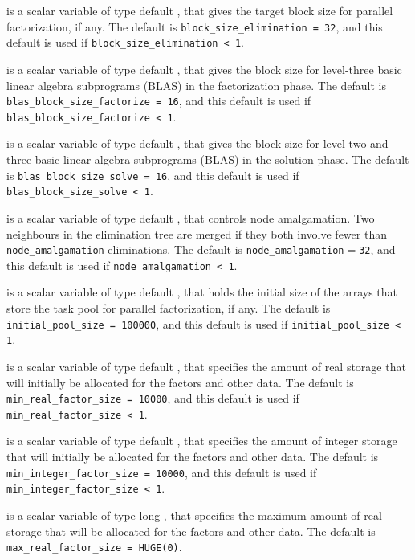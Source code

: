 \documentclass{galahad}
\begin{document}
\begin{description}
 is a scalar variable of type default \integer,
that gives the target block size for parallel factorization, if any.
The default is {\tt block\_size\_elimination = 32},
and this default is used if {\tt block\_size\_\-elimination < 1}.

 is a scalar variable of type default \integer,
that gives the block size for level-three basic linear algebra subprograms
(BLAS) in the factorization phase.
The default is {\tt blas\_block\_size\_factorize = 16},
and this default is used if {\tt blas\_block\_size\_factorize < 1}.

 is a scalar variable of type default \integer,
that gives the block size for level-two and -three basic linear algebra
subprograms (BLAS) in the solution phase.
The default is {\tt blas\_block\_size\_solve = 16},
and this default is used if {\tt blas\_block\_size\_solve < 1}.

 is a scalar variable of type default \integer,
that controls node amalgamation. Two neighbours in the elimination tree are
merged if they both involve fewer than {\tt node\_amalgamation} eliminations.
The default is {\tt node\_amalgamation$=$32}, and this default is used
if {\tt node\_amalgamation < 1}.

 is a scalar variable of type default \integer,
that holds the initial size of the arrays that store the task pool for
parallel factorization, if any.
The default is {\tt initial\_pool\_size = 100000},
and this default is used if {\tt initial\_pool\_size < 1}.

 is a scalar variable of type default \integer,
that specifies the amount of real storage that will initially be
allocated for the factors and other data.
The default is {\tt min\_real\_factor\_size = 10000},
and this default is used if {\tt min\_real\_factor\_size < 1}.

 is a scalar variable of type default \integer,
that specifies the amount of integer storage that will initially be
allocated for the factors and other data.
The default is {\tt min\_integer\_factor\_size = 10000},
and this default is used if {\tt min\_integer\_factor\_size < 1}.

 is a scalar variable of type long \integer,
that specifies the maximum amount of real storage that will be
allocated for the factors and other data.
The default is {\tt max\_real\_factor\_size = HUGE(0)}.


\end{description}
\end{document}
